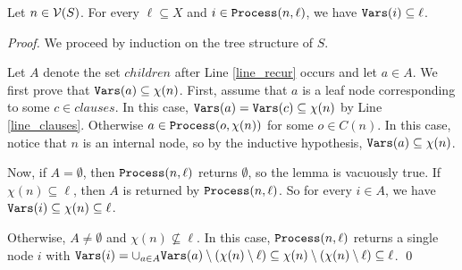 \begin{lemma}
\label{lem:td-bounds}
    Let $n \in \mathcal{V}(S)$.
    For every $\ell \subseteq X$ and $i \in \texttt{\upshape Process}(n, \ell)$, we have $\texttt{\upshape Vars}(i) \subseteq \ell$.
\end{lemma}
\begin{proof}
    We proceed by induction on the tree structure of $S$.

    Let $A$ denote the set $children$ after Line \ref{line_recur} occurs and let $a \in A$.
    We first prove that $\texttt{\upshape Vars}(a) \subseteq \chi(n)$.
    First, assume that $a$ is a leaf node corresponding to some $c \in clauses$.
    In this case, $\texttt{\upshape Vars}(a) = \texttt{\upshape Vars}(c) \subseteq \chi(n)$ by Line \ref{line_clauses}.
    Otherwise $a \in \texttt{\upshape Process}(o, \chi(n))$ for some $o \in C(n)$.
    In this case, notice that $n$ is an internal node, so by the inductive hypothesis, $\texttt{\upshape Vars}(a) \subseteq \chi(n)$.

    Now, if $A = \emptyset$, then $\texttt{\upshape Process}(n, \ell)$ returns $\emptyset$, so the lemma is vacuously true.
    If $\chi(n) \subseteq \ell$, then $A$ is returned by $\texttt{\upshape Process}(n, \ell)$.
    So for every $i \in A$, we have $\texttt{\upshape Vars}(i) \subseteq \chi(n) \subseteq \ell$.

    Otherwise, $A \neq \emptyset$ and $\chi(n) \not\subseteq \ell$.
    In this case, $\texttt{\upshape Process}(n, \ell)$ returns a single node $i$ with $\texttt{\upshape Vars}(i) = \cup_{a \in A} \texttt{\upshape Vars}(a) \setminus (\chi(n) \setminus \ell) \subseteq \chi(n) \setminus (\chi(n) \setminus \ell) \subseteq \ell$.
\qed
\end{proof}





